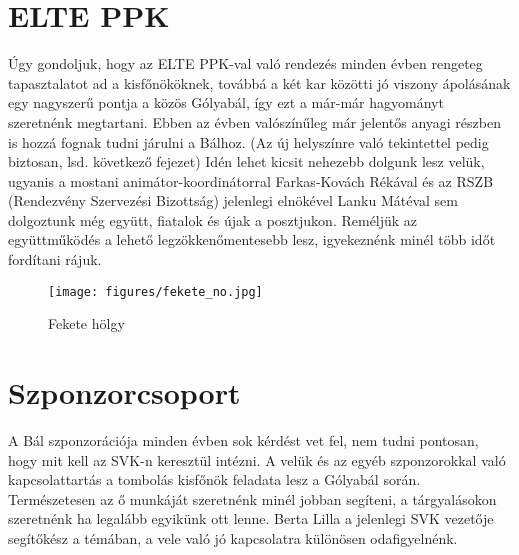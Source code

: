 \section{ELTE PPK}
\hspace{2mm} Úgy gondoljuk, hogy az ELTE PPK-val való rendezés minden évben rengeteg tapasztalatot ad a kisfőnököknek, továbbá a két kar közötti jó viszony ápolásának egy nagyszerű pontja a közös Gólyabál, így ezt a már-már hagyományt szeretnénk megtartani. Ebben az évben valószínűleg már jelentős anyagi részben is hozzá fognak tudni járulni a Bálhoz. (Az új helyszínre való tekintettel pedig biztosan, lsd. következő fejezet) Idén lehet kicsit nehezebb dolgunk lesz velük, ugyanis a mostani animátor-koordinátorral Farkas-Kovách Rékával és az RSZB (Rendezvény Szervezési Bizottság) jelenlegi elnökével Lanku Mátéval sem dolgoztunk még együtt, fiatalok és újak a posztjukon. Reméljük az együttműködés a lehető legzökkenőmentesebb lesz, igyekeznénk minél több időt fordítani rájuk.
\begin{wrapfigure}[10]{r}{0.23\textwidth} 
\begin{center}
\texttt{[image: figures/fekete\_no.jpg]}
\end{center}
\caption{Fekete hölgy} 
\label{fig:FeketeNo}
\end{wrapfigure}
\section{Szponzorcsoport}
\hspace{2mm} A Bál szponzorációja minden évben sok kérdést vet fel, nem tudni pontosan, hogy mit kell az SVK-n keresztül intézni. A velük és az egyéb szponzorokkal való kapcsolattartás a tombolás kisfőnök feladata lesz a Gólyabál során. Természetesen az ő munkáját szeretnénk minél jobban segíteni, a tárgyalásokon szeretnénk ha legalább egyikünk ott lenne. Berta Lilla a jelenlegi SVK vezetője segítőkész a témában, a vele való jó kapcsolatra különösen odafigyelnénk.

